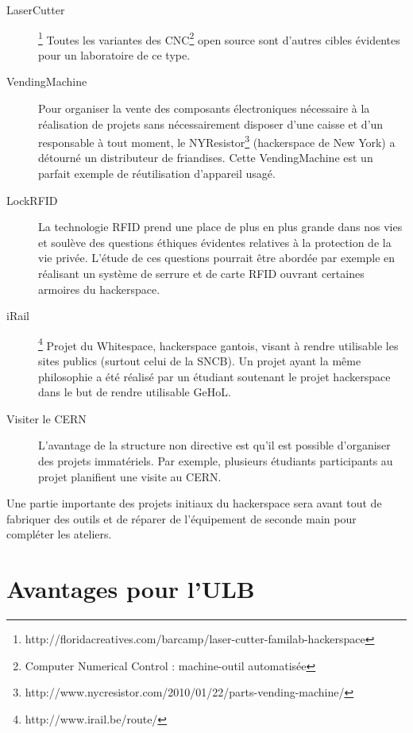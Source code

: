 \documentclass{article}
\begin{document}
\begin{description}
\item[LaserCutter]\footnote{http://floridacreatives.com/barcamp/laser-cutter-familab-hackerspace} Toutes les variantes des CNC\footnote{Computer Numerical Control : machine-outil automatisée} open source sont d'autres cibles évidentes pour un laboratoire de ce type.
\item[VendingMachine] Pour organiser la vente des composants électroniques nécessaire à la réalisation de projets sans nécessairement disposer d'une caisse et d'un responsable à tout moment, le NYResistor\footnote{http://www.nycresistor.com/2010/01/22/parts-vending-machine/} (hackerspace de New York) a détourné un distributeur de friandises. Cette VendingMachine est un parfait exemple de réutilisation d'appareil usagé.
\item[LockRFID] La technologie RFID prend une place de plus en plus grande dans nos vies et soulève des questions éthiques évidentes relatives à la protection de la vie privée. L'étude de ces questions pourrait être abordée par exemple en réalisant un système de serrure et de carte RFID ouvrant certaines armoires du hackerspace.
\item[iRail]\footnote{http://www.irail.be/route/} Projet du Whitespace, hackerspace gantois, visant à rendre utilisable les sites publics (surtout celui de la SNCB). Un projet ayant la même philosophie a été réalisé par un étudiant soutenant le projet hackerspace dans le but de rendre utilisable GeHoL.
\item[Visiter le CERN] L'avantage de la structure non directive est qu'il est possible d'organiser des projets immatériels. Par exemple, plusieurs étudiants participants au projet planifient une visite au CERN.
\end{description}

Une partie importante des projets initiaux du hackerspace sera avant tout de fabriquer des outils et de réparer de l'équipement de seconde main pour compléter les ateliers.

\section{Avantages pour l'ULB}
\end{document}
